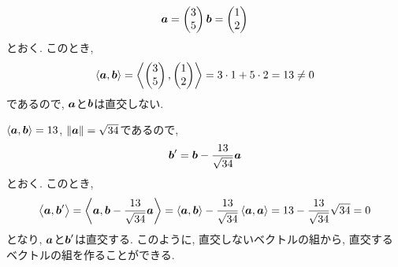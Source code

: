 \begin{example}
  \label{ex:vecs:nonortho}
  \begin{align*}
    \boldsymbol{a}=\begin{pmatrix}3\\5\end{pmatrix}
    \boldsymbol{b}=\begin{pmatrix}1\\2\end{pmatrix}
  \end{align*}
  とおく.
  このとき,
  \begin{align*}
    \Braket{\boldsymbol{a},\boldsymbol{b}}=\Braket{\begin{pmatrix}3\\5\end{pmatrix},\begin{pmatrix}1\\2\end{pmatrix}}
    =3\cdot1+5\cdot 2=13\neq 0
  \end{align*}
  であるので,
  $\boldsymbol{a}$と$\boldsymbol{b}$は直交しない.

  $\Braket{\boldsymbol{a},\boldsymbol{b}}=13$,
  $\|\boldsymbol{a}\|=\sqrt{34}$であるので,
  \begin{align*}
    \boldsymbol{b}'=\boldsymbol{b}-\frac{13}{\sqrt{34}}\boldsymbol{a}
  \end{align*}
  とおく.  このとき,
  \begin{align*}
    \Braket{\boldsymbol{a},\boldsymbol{b}'}
    =\Braket{\boldsymbol{a},\boldsymbol{b}-\frac{13}{\sqrt{34}}\boldsymbol{a}}
    =\Braket{\boldsymbol{a},\boldsymbol{b}}-\frac{13}{\sqrt{34}}\Braket{\boldsymbol{a},\boldsymbol{a}}
    =13-\frac{13}{\sqrt{34}}\sqrt{34}
    =0
  \end{align*}
  となり,
  $\boldsymbol{a}$と$\boldsymbol{b}'$は直交する.
  このように, 直交しないベクトルの組から, 直交するベクトルの組を作ることができる.
\end{example}

